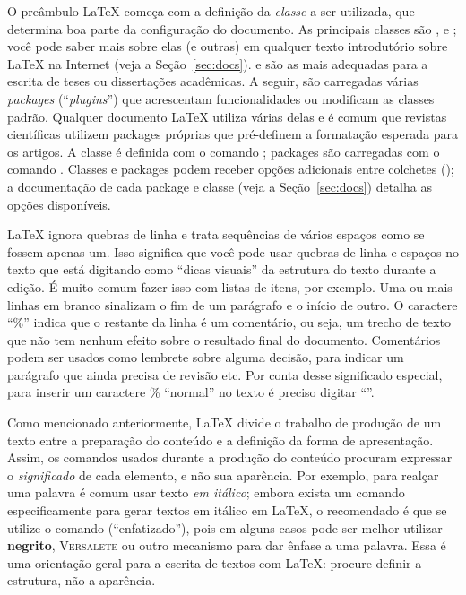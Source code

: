 O preâmbulo \LaTeX{} começa com a definição da \emph{classe} a ser utilizada,
que determina boa parte da configuração do documento. As principais classes
são ,  e ; você pode saber mais sobre elas
(e outras) em qualquer texto introdutório sobre \LaTeX{} na Internet (veja a
Seção~\ref{sec:docs}).  e  são as mais adequadas para a
escrita de teses ou dissertações acadêmicas.
A seguir, são carregadas várias \emph{packages} (``\emph{plugins}'') que
acrescentam funcionalidades ou modificam as classes padrão. Qualquer documento
\LaTeX{} utiliza várias delas e é comum que revistas científicas utilizem
packages próprias que pré-definem a formatação esperada para os artigos.
A classe é definida com o comando ;
packages são carregadas com o comando .
Classes e packages podem receber opções adicionais entre colchetes
(); a documentação
de cada package e classe (veja a Seção~\ref{sec:docs}) detalha as opções
disponíveis.

\LaTeX{} ignora quebras de linha e trata sequências de vários espaços como
se fossem apenas um. Isso significa que você pode usar quebras de linha e
espaços no texto que está digitando como ``dicas visuais'' da estrutura do
texto durante a edição. É muito comum fazer isso com listas de itens, por
exemplo. Uma ou mais linhas em branco sinalizam o fim de um parágrafo e o
início de outro. O caractere ``\%'' indica que o restante da linha é um
comentário, ou seja, um trecho de texto que não tem nenhum efeito sobre o
resultado final do documento. Comentários podem ser usados como lembrete sobre
alguma decisão, para indicar um parágrafo que ainda precisa de revisão etc.
Por conta desse significado especial, para inserir um caractere \% ``normal''
no texto é preciso digitar ``\ltxcmd{\%}''.

Como mencionado anteriormente, \LaTeX{} divide o trabalho de produção
de um texto entre a preparação do conteúdo e a definição da forma de
apresentação. Assim, os comandos usados durante a produção do conteúdo
procuram expressar o \emph{significado} de cada elemento, e não sua
aparência. Por exemplo, para realçar uma palavra é comum usar texto
\textit{em itálico}; embora exista um comando especificamente para gerar
textos em itálico em \LaTeX{}, o recomendado é que se utilize o comando
 (``enfatizado''), pois em alguns casos pode ser melhor
utilizar \textbf{negrito}, \textsc{Versalete} ou outro mecanismo para
dar ênfase a uma palavra. Essa é uma orientação geral para a escrita de
textos com \LaTeX{}: procure definir a estrutura, não a aparência.

